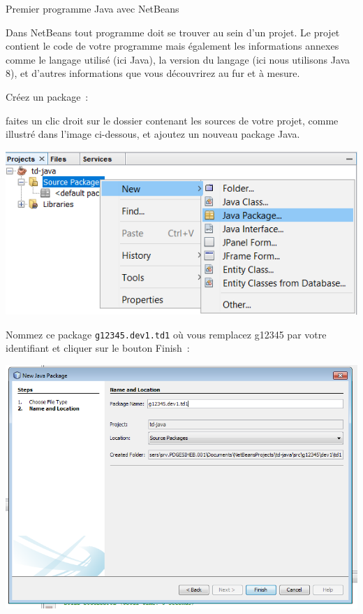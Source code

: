 \documentclass[a4paper,11pt]{article}
\begin{document}
\begin{Tutoriel}{Premier programme Java avec NetBeans}
\begin{steps}
			Dans NetBeans tout programme doit se trouver au sein d'un projet.
			Le projet contient le code de votre programme mais également les 
			informations annexes comme le langage utilisé (ici Java), 
			la version du langage (ici nous utilisons Java 8), 
			et d'autres informations que vous découvrirez au fur et à mesure.



		\item Créez un package~: 
		
			faites un clic droit sur le dossier contenant les sources de votre projet, 
			comme illustré dans l'image ci-dessous, et ajoutez un nouveau package Java.
		
			\bigskip
			\begin{center}
				\includegraphics[width=.9\textwidth]{images/nb_newproject_package}
			\end{center}

			Nommez ce package \texttt{g12345.dev1.td1} où vous remplacez g12345 par votre identifiant et cliquer sur le bouton \og Finish\fg~:
			
			\bigskip
			\begin{center}
				\includegraphics[width=.9\textwidth]{images/nb_newproject_package2}
			\end{center}
			

\end{steps}
\end{Tutoriel}
\end{document}
